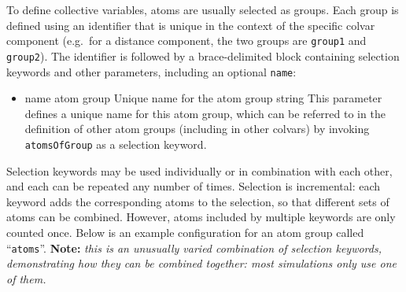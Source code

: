 
To define collective variables, atoms are usually selected as groups.  Each group is defined using an identifier that is unique in the context of the specific colvar component (e.g.~for a distance component, the two groups are \texttt{group1} and \texttt{group2}).
The identifier is followed by a brace-delimited block containing selection keywords and other parameters, including an optional \texttt{name}:

\begin{itemize}
\item \key
  {name}{%
  atom group}{%
  Unique name for the atom group}{%
  string}{%
  This parameter defines a unique name for this atom group, which can be referred to
  in the definition of other atom groups (including in other colvars) by invoking
  \texttt{atomsOfGroup} as a selection keyword.}
\end{itemize}



Selection keywords may be used individually or in combination with each other, and each can be repeated any number of times.
Selection is incremental: each keyword adds the corresponding atoms to the selection, so that different sets of atoms can be combined.
However, atoms included by multiple keywords are only counted once.
Below is an example configuration for an atom group called ``\texttt{atoms}''.
\textbf{Note: }\emph{this is an unusually varied combination of selection keywords, demonstrating how they can be combined together: most simulations only use one of them.}\\

